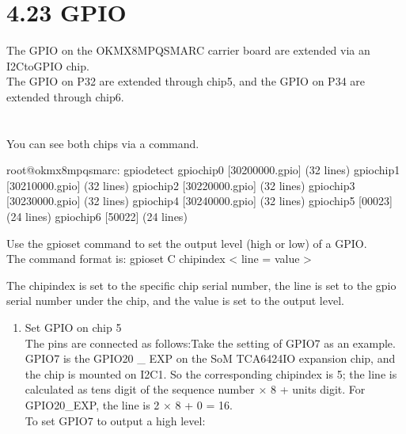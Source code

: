 \documentclass[letterpaper,10pt,openany,english]{sphinxmanual}
\begin{document}
\section{4.23 GPIO}
\label{\detokenize{linux-manual:gpio}}
\sphinxAtStartPar
The GPIO on the OK\sphinxhyphen{}MX8MPQ\sphinxhyphen{}SMARC carrier board are extended via an I2C\sphinxhyphen{}to\sphinxhyphen{}GPIO chip.\\
The GPIO on P32 are extended through chip5, and the GPIO on P34 are extended through chip6.\\
\\
\\
You can see both chips via a command.

\begin{sphinxVerbatim}[commandchars=\\\{\}]
root@ok\PYGZhy{}mx8mpq\PYGZhy{}smarc:\PYGZti{}\PYGZsh{} gpiodetect 
gpiochip0 [30200000.gpio] (32 lines)
gpiochip1 [30210000.gpio] (32 lines)
gpiochip2 [30220000.gpio] (32 lines)
gpiochip3 [30230000.gpio] (32 lines)
gpiochip4 [30240000.gpio] (32 lines)
gpiochip5 [0\PYGZhy{}0023] (24 lines)
gpiochip6 [5\PYGZhy{}0022] (24 lines)
\end{sphinxVerbatim}

\sphinxAtStartPar
Use the gpioset command to set the output level (high or low) of a GPIO.\\
The command format is: gpioset \sphinxhyphen{}C chipindex < line = value >

\sphinxAtStartPar
The chipindex is set to the specific chip serial number, the line is set to the gpio serial number under the chip, and the value is set to the output level.
\begin{enumerate}
%
\item {} 
\sphinxAtStartPar
Set GPIO on chip 5\\
The pins are connected as follows:Take the setting of GPIO7 as an example. GPIO7 is the GPIO20 \_ EXP on the SoM TCA6424IO expansion chip, and the chip is mounted on I2C1. So the corresponding chipindex is 5; the line is calculated as tens digit of the sequence number × 8 + units digit. For GPIO20\_EXP, the line is 2 × 8 + 0 = 16.\\
To set GPIO7 to output a high level:

\end{enumerate}
\end{document}
